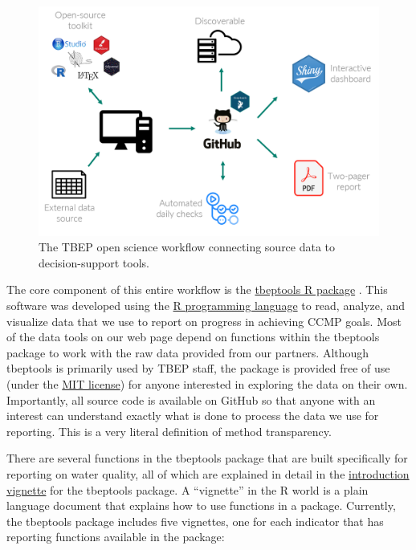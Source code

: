 \documentclass[
]{book}
\begin{document}
\begin{figure}

{\centering \includegraphics[width=1\linewidth]{img/os-workflow} 

}

\caption{The TBEP open science workflow connecting source data to decision-support tools.}\label{fig:osworkflow}
\end{figure}

The core component of this entire workflow is the \href{https://tbep-tech.github.io/tbeptools/}{tbeptools R package} \citep{Beck21}. This software was developed using the \href{https://cran.r-project.org/}{R programming language} to read, analyze, and visualize data that we use to report on progress in achieving CCMP goals. Most of the data tools on our web page depend on functions within the tbeptools package to work with the raw data provided from our partners. Although tbeptools is primarily used by TBEP staff, the package is provided free of use (under the \href{https://tldrlegal.com/license/mit-license}{MIT license}) for anyone interested in exploring the data on their own. Importantly, all source code is available on GitHub so that anyone with an interest can understand exactly what is done to process the data we use for reporting. This is a very literal definition of method transparency.

There are several functions in the tbeptools package that are built specifically for reporting on water quality, all of which are explained in detail in the \href{https://tbep-tech.github.io/tbeptools/articles/intro.html}{introduction vignette} for the tbeptools package. A ``vignette'' in the R world is a plain language document that explains how to use functions in a package. Currently, the tbeptools package includes five vignettes, one for each indicator that has reporting functions available in the package:
\end{document}
